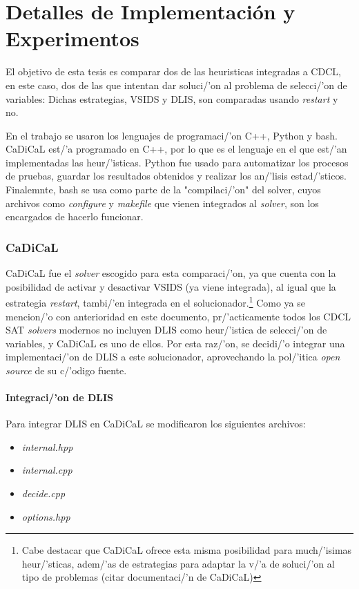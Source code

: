\chapter{Detalles de Implementación y Experimentos}\label{chapter:implementation}
El objetivo de esta tesis es comparar dos de las heuristicas integradas a CDCL, en este caso, dos de las que intentan dar soluci/'on al problema de selecci/'on de variables: Dichas estrategias, VSIDS y DLIS, son comparadas usando \textit{restart} y no.

En el trabajo se usaron los lenguajes de programaci/'on C++, Python y bash. CaDiCaL est/'a programado en C++, por lo que es el lenguaje en el que est/'an implementadas las heur/'isticas. Python fue usado para automatizar los procesos de pruebas, guardar los resultados obtenidos y realizar los an/'lisis estad/'sticos. Finalemnte, bash se usa como parte de la "compilaci/'on" del solver, cuyos archivos como \textit{configure} y \textit{makefile} que vienen integrados al \textit{solver}, son los encargados de hacerlo funcionar.

\subsection{CaDiCaL}
CaDiCaL fue el \textit{solver} escogido para esta comparaci/'on, ya que cuenta con la posibilidad de activar y desactivar VSIDS (ya viene integrada), al igual que la estrategia \textit{restart}, tambi/'en integrada en el solucionador.\footnote{Cabe destacar que CaDiCaL ofrece esta misma posibilidad para much/'isimas heur/'sticas, adem/'as de estrategias para adaptar la v/'a de soluci/'on al tipo de problemas (citar documentaci/'n de CaDiCaL)} Como ya se mencion/'o con anterioridad en este documento, pr/'acticamente todos los CDCL SAT \textit{solvers} modernos no incluyen DLIS como heur/'istica de selecci/'on de variables, y CaDiCaL es uno de ellos. Por esta raz/'on, se decidi/'o integrar una implementaci/'on de DLIS a este solucionador, aprovechando la pol/'itica \textit{open source} de su c/'odigo fuente.%

\subsubsection{Integraci/'on de DLIS}
Para integrar DLIS en CaDiCaL se modificaron los siguientes archivos:
\begin{itemize}
    \item \textit{internal.hpp}
    \item \textit{internal.cpp}
    \item \textit{decide.cpp}
    \item \textit{options.hpp}
\end{itemize}

